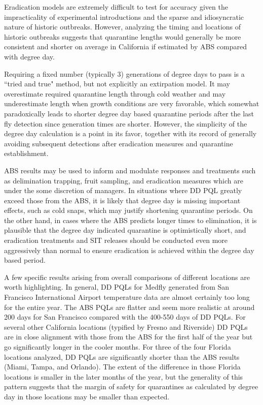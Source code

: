 \documentclass[10pt,a4paper,twocolumn]{article}
\begin{document}

Eradication models are extremely difficult to test for accuracy given 
the impracticality of experimental introductions and 
the sparse and idiosyncratic nature of historic outbreaks.
However, analyzing the timing and locations of historic outbreaks 
suggests that quarantine lengths would generally be more consistent
and shorter on average in California if estimated by ABS compared with degree day. 

Requiring a fixed number (typically 3) generations of degree days to pass is 
a ``tried and true" method, but not explicitly an extirpation model.
It may overestimate required quarantine length through cold weather\cite{manoukis_agent-based_2014}
and may underestimate length when growth conditions are very favorable, 
which somewhat paradoxically leads to shorter degree day based quarantine periods after the 
last fly detection since generation times are shorter. %
However, the simplicity of the degree day calculation is a point in its favor, together with 
its record of generally avoiding subsequent detections after
eradication measures and quarantine establishment\cite{mcinnis2017can}.

ABS results may be used to inform and modulate responses and treatments such as
delimination trapping, fruit sampling, and eradication measures which are under
the some discretion of managers.
In situations where DD PQL greatly exceed those from the ABS, it is likely
that degree day is missing important effects, such as cold snaps, which may justify
shortening quarantine periods.
On the other hand, in cases where the ABS predicts longer times to elimination, it
is plausible that the degree day indicated quarantine is optimistically short, and 
eradication treatments and SIT releases should be conducted even more aggressively than
normal to ensure eradication is achieved within the degree day based period. %


A few specific results arising from overall comparisons of different locations are worth highlighting. 
In general, DD PQLs for Medfly 
generated from San Francisco International Airport temperature data
 are almost certainly too long for the entire year.
The ABS PQLs are flatter and seem more realistic at around 200 days for San
Francisco compared with the 400-550 days of DD PQLs. 
For several other California locations (typified by Fresno and 
Riverside) DD PQLs are in close alignment with those from the ABS 
for the first half of the year 
but go significantly longer in the cooler months. 
For three of the four Florida locations analyzed, 
DD PQLs are significantly shorter than the ABS results
 (Miami, Tampa, and Orlando).
The extent of the difference in those Florida locations is smaller in the later months of the year,
but the generality of this pattern suggests that the margin of safety for quarantines as 
calculated by degree day in those locations may be smaller than expected. 
\end{document}
